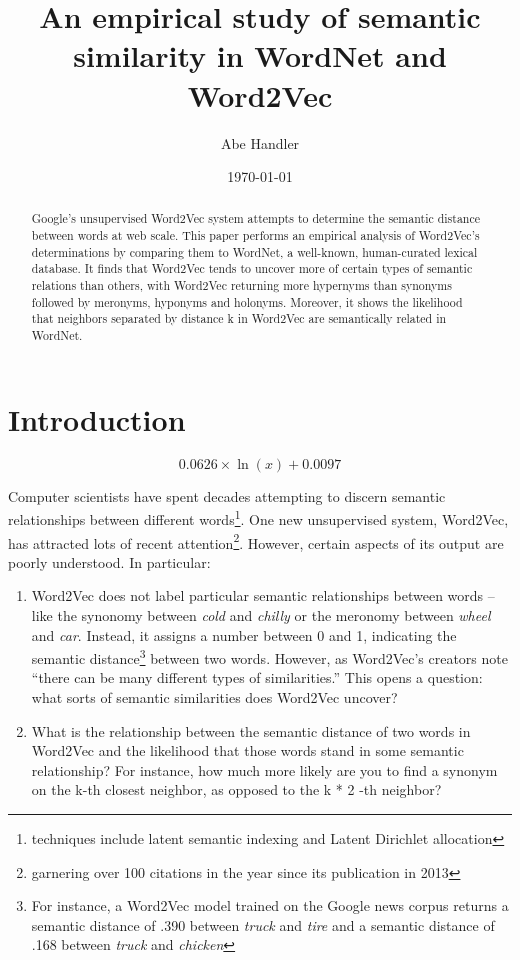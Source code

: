 \documentclass{article}
\title{An empirical study of semantic similarity in WordNet and Word2Vec}
\author{Abe Handler}
\date{\today}
\begin{document}
\begin{abstract}
Google's unsupervised Word2Vec system attempts to determine the semantic distance between words at web scale. This paper performs an empirical analysis of Word2Vec's determinations by comparing them to WordNet, a well-known, human-curated lexical database. It finds that Word2Vec tends to uncover more of certain types of semantic relations than others, with Word2Vec returning more hypernyms than synonyms followed by meronyms, hyponyms and holonyms. Moreover, it shows the likelihood that neighbors separated by distance k in Word2Vec are semantically related in WordNet.
\end{abstract}

\maketitle

\section{Introduction}

\[
0.0626\times\ln{(x)} + 0.0097
\]

Computer scientists have spent decades attempting to discern semantic relationships between different words\footnote{techniques include latent semantic indexing and Latent Dirichlet allocation}. One new unsupervised system, Word2Vec, has attracted lots of recent attention\footnote{garnering over 100 citations in the year since its publication in 2013}. However, certain aspects of its output are poorly understood. In particular: 

\begin{enumerate}
\item Word2Vec does not label particular semantic relationships between words -- like the synonomy between \textit{cold} and \textit{chilly} or the meronomy between \textit{wheel} and \textit{car}. Instead, it assigns a number between 0 and 1, indicating the semantic distance\footnote{For instance, a Word2Vec model trained on the Google news corpus returns a semantic distance of .390 between \textit{truck} and \textit{tire} and a semantic distance of .168 between \textit{truck} and \textit{chicken}} between two words. However, as Word2Vec’s creators note ``there can be many different types of similarities.” \cite{mikolov2013efficient} This opens a question: what sorts of semantic similarities does Word2Vec uncover?
\item What is the relationship between the semantic distance of two words in Word2Vec and the likelihood that those words stand in some semantic relationship? For instance, how much more likely are you to find a synonym on the k-th closest neighbor, as opposed to the k * 2 -th neighbor?
\end{enumerate}
\end{document}
